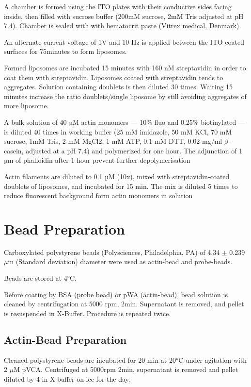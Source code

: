 \documentclass[A4paperpaper,11pt,english]{sphinxmanual}
\begin{document}
A chamber is formed using the ITO plates with their conductive sides facing
inside, then filled with sucrose buffer (200mM sucrose, 2mM Tris adjusted at pH
7.4). Chamber is sealed with with hematocrit paste (Vitrex medical, Denmark).

An alternate current voltage of 1V and 10 Hz is applied between the ITO-coated
surfaces for 75minutes to form liposomes.

Formed liposomes are incubated 15 minutes with 160 nM streptavidin in order to
coat them with streptavidin. Liposomes coated with streptavidin tends to
aggregates.  Solution containing doublets is then diluted 30 times. Waiting
15 minutes increase the ratio doublets/single liposome by still avoiding
aggregates of more liposome.

A bulk solution of 40 µM actin monomers — 10\% fluo and 0.25\% biotinylated — is
diluted 40 times in working buffer (25 mM imidazole, 50 mM KCl, 70 mM sucrose,
1mM Tris, 2 mM MgCl2, 1 mM ATP, 0.1 mM DTT, 0.02 mg/ml \(\beta\)-casein, adjusted at a
pH 7.4) and polymerized for one hour. The adjunction of 1 µm of phalloidin
after 1 hour prevent further depolymerisation

Actin filaments are
diluted to 0.1 µM (10x), mixed with streptavidin-coated doublets of
liposomes, and incubated for 15 min. The mix is diluted 5 times to reduce fluorescent background form actin monomers in solution


\section{Bead Preparation}
\label{parts/part2:id5}\label{parts/part2:bead-preparation}
Carboxylated polystyrene beads (Polysciences, Philadelphia, PA) of 4.34 \(\pm\) 0.239
\(\mu\)m (Standard deviation) diameter were used as actin-bead and probe-beads.

Beads are stored at 4°C.

Before coating by BSA (probe bead) or pWA (actin-bead), bead solution is
cleaned by centrifugation at 5000 rpm, 2min. Supernatant is removed, and pellet
is resuspended in X-Buffer. Procedure is repeated twice.


\subsection{Actin-Bead Preparation}
\label{parts/part2:actin-bead-preparation}
Cleaned polystyrene beads are incubated for 20 min at 20°C under agitation with
2 \(\mu\)M pVCA. Centrifuged at 5000rpm 2min, supernatant is removed and pellet
diluted by 4 in X-buffer on ice for the day.
\end{document}
